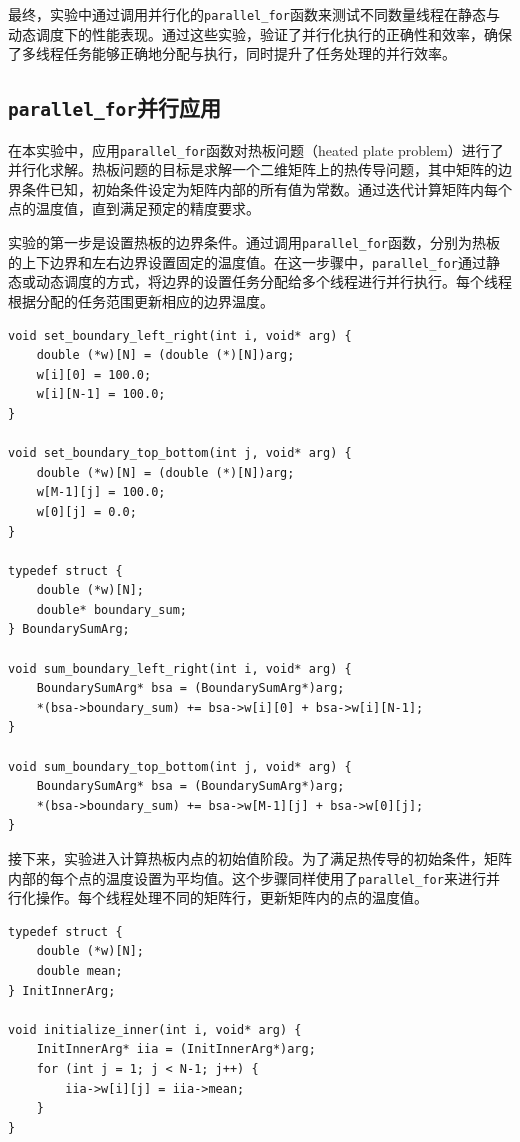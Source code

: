 \documentclass[a4paper, utf8]{ctexart}
\begin{document}
	最终，实验中通过调用并行化的\verb|parallel_for|函数来测试不同数量线程在静态与动态调度下的性能表现。通过这些实验，验证了并行化执行的正确性和效率，确保了多线程任务能够正确地分配与执行，同时提升了任务处理的并行效率。
	
	\subsection{\texttt{parallel\_for}并行应用}
	
	在本实验中，应用\verb|parallel_for|函数对热板问题（heated plate problem）进行了并行化求解。热板问题的目标是求解一个二维矩阵上的热传导问题，其中矩阵的边界条件已知，初始条件设定为矩阵内部的所有值为常数。通过迭代计算矩阵内每个点的温度值，直到满足预定的精度要求。
	
	实验的第一步是设置热板的边界条件。通过调用\verb|parallel_for|函数，分别为热板的上下边界和左右边界设置固定的温度值。在这一步骤中，\verb|parallel_for|通过静态或动态调度的方式，将边界的设置任务分配给多个线程进行并行执行。每个线程根据分配的任务范围更新相应的边界温度。
	
	\begin{verbatim}
void set_boundary_left_right(int i, void* arg) {
    double (*w)[N] = (double (*)[N])arg;
    w[i][0] = 100.0;
    w[i][N-1] = 100.0;
}

void set_boundary_top_bottom(int j, void* arg) {
    double (*w)[N] = (double (*)[N])arg;
    w[M-1][j] = 100.0;
    w[0][j] = 0.0;
}

typedef struct {
    double (*w)[N];
    double* boundary_sum;
} BoundarySumArg;

void sum_boundary_left_right(int i, void* arg) {
    BoundarySumArg* bsa = (BoundarySumArg*)arg;
    *(bsa->boundary_sum) += bsa->w[i][0] + bsa->w[i][N-1];
}

void sum_boundary_top_bottom(int j, void* arg) {
    BoundarySumArg* bsa = (BoundarySumArg*)arg;
    *(bsa->boundary_sum) += bsa->w[M-1][j] + bsa->w[0][j];
}
	\end{verbatim}
	
	接下来，实验进入计算热板内点的初始值阶段。为了满足热传导的初始条件，矩阵内部的每个点的温度设置为平均值。这个步骤同样使用了\verb|parallel_for|来进行并行化操作。每个线程处理不同的矩阵行，更新矩阵内的点的温度值。
	
	\begin{verbatim}
typedef struct {
    double (*w)[N];
    double mean;
} InitInnerArg;

void initialize_inner(int i, void* arg) {
    InitInnerArg* iia = (InitInnerArg*)arg;
    for (int j = 1; j < N-1; j++) {
        iia->w[i][j] = iia->mean;
    }
}
	\end{verbatim}
	
\end{document}
